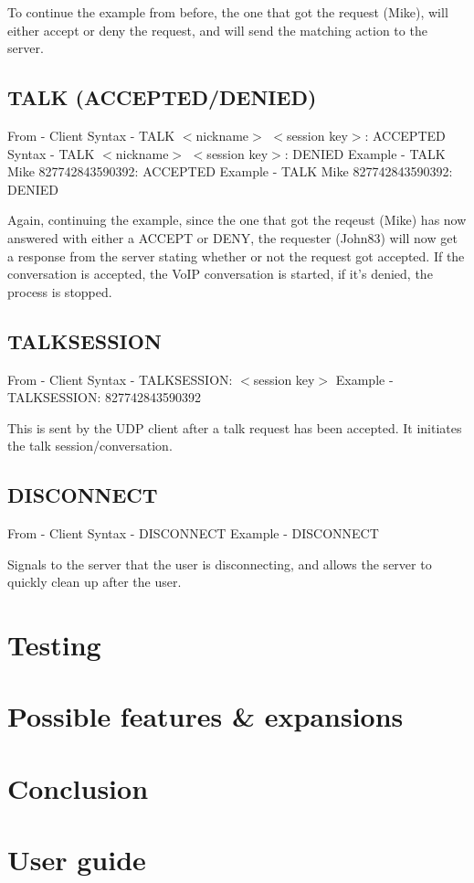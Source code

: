 \documentclass[12pt]{rapport}
\begin{document}
\noindent To continue the example from before, the one that got the request (Mike), will either accept or deny the request, and will send the matching action to the server.

\subsection*{TALK (ACCEPTED/DENIED)}
From    - Client\newline
Syntax  - TALK $<$nickname$>$ $<$session key$>$: ACCEPTED\newline
Syntax  - TALK $<$nickname$>$ $<$session key$>$: DENIED\newline
Example - TALK Mike 827742843590392: ACCEPTED\newline
Example - TALK Mike 827742843590392: DENIED\newline

\noindent Again, continuing the example, since the one that got the reqeust (Mike) has now answered with either a ACCEPT or DENY, the requester (John83) will now get a response from the server stating whether or not the request got accepted. If the conversation is accepted, the VoIP conversation is started, if it's denied, the process is stopped.

\subsection*{TALKSESSION}
From    - Client\newline
Syntax  - TALKSESSION: $<$session key$>$\newline
Example - TALKSESSION: 827742843590392\newline

\noindent This is sent by the UDP client after a talk request has been accepted. It initiates the talk session/conversation.

\subsection*{DISCONNECT}
From    - Client\newline
Syntax  - DISCONNECT\newline
Example - DISCONNECT\newline

\noindent Signals to the server that the user is disconnecting, and allows the server to quickly clean up after the user.


\section*{Testing}



\section*{Possible features \& expansions}



\newpage
\section*{Conclusion}




\newpage
\section*{User guide}
\end{document}
